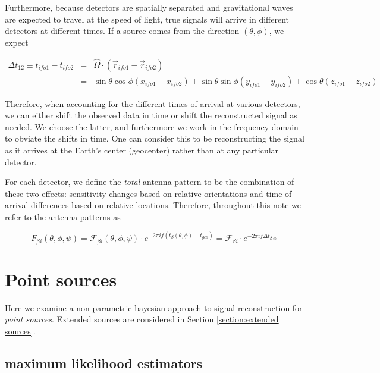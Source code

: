 \documentclass[10pt]{article}
\begin{document}
Furthermore, because detectors are spatially separated and gravitational waves are expected to travel at the speed of light, true signals will arrive in different detectors at different times. If a source comes from the direction $(\theta,\phi)$, we expect

\begin{eqnarray}
\Delta t_{12} \equiv t_{ifo1} - t_{ifo2} & = & \hat{\Omega}\cdot(\vec{r}_{ifo1}-\vec{r}_{ifo2}) \nonumber \\
                                         & = & \sin\theta\cos\phi(x_{ifo1}-x_{ifo2}) + \sin\theta\sin\phi(y_{ifo1}-y_{ifo2}) + \cos\theta(z_{ifo1}-z_{ifo2})
\end{eqnarray}

Therefore, when accounting for the different times of arrival at various detectors, we can either shift the observed data in time or shift the reconstructed signal as needed. We choose the latter, and furthermore we work in the frequency domain to obviate the shifts in time. One can consider this to be reconstructing the signal as it arrives at the Earth's center (geocenter) rather than at any particular detector.

For each detector, we define the \emph{total} antenna pattern to be the combination of these two effects: sensitivity changes based on relative orientations and time of arrival differences based on relative locations. Therefore, throughout this note we refer to the antenna patterns as 

\begin{equation}
F_{\beta i}(\theta,\phi,\psi) = \mathcal{F}_{\beta i}(\theta,\phi,\psi) \cdot e^{-2\pi i f (t_{\beta}(\theta,\phi) - t_{geo})} = \mathcal{F}_{\beta i} \cdot e^{-2\pi i f \Delta t_{\beta\oplus}}
\end{equation}


\section{Point sources}\label{section:point sources}

Here we examine a non-parametric bayesian approach to signal reconstruction for \emph{point sources}. Extended sources are considered in Section \ref{section:extended sources}.

\subsection{maximum likelihood estimators}
\end{document}
